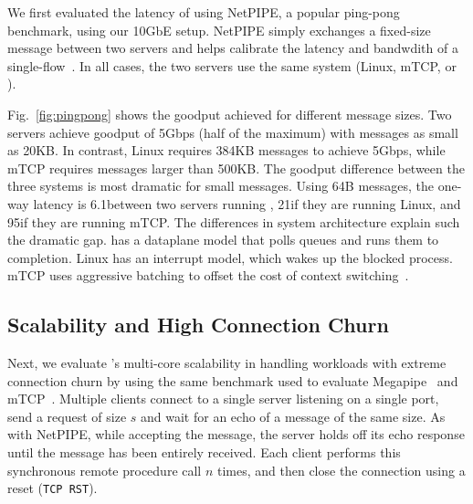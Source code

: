 We first evaluated the latency of \ix using NetPIPE, a popular
ping-pong benchmark, using our 10GbE setup.  NetPIPE simply exchanges
a fixed-size message between two servers and helps calibrate the
latency and bandwdith of a single-flow~\cite{snell1996netpipe}.  In
all cases, the two servers use the same system (Linux, mTCP, or \ix).


Fig.~\ref{fig:pingpong} shows the goodput achieved for
different message sizes.  Two \ix servers achieve goodput of 5Gbps
(half of the maximum) with messages as small as 20KB. In
contrast, Linux requires 384KB messages to achieve 5Gbps, while
mTCP requires messages larger than 500KB. The goodput difference
between the three systems is most dramatic for small messages. Using
64B messages, the one-way latency is 6.1\microsecond between two
servers running \ix, 21\microsecond if they are running Linux, and
95\microsecond if they are running mTCP.  The differences in system
architecture explain such the dramatic gap. \ix has a dataplane model
that polls queues and runs them to completion. Linux has an interrupt
model, which wakes up the blocked process. mTCP uses aggressive
batching to offset the cost of context switching~\cite{jeong2014mtcp}.


\subsection{Scalability and High Connection Churn}
\label{sec:eval:short}

%

Next, we evaluate \ix's multi-core scalability in handling workloads
with extreme connection churn by using the same benchmark used to
evaluate Megapipe~\cite{han2012megapipe} and
mTCP~\cite{jeong2014mtcp}. Multiple clients connect to a single server
listening on a single port, send a request of size $s$ and wait for an
echo of a message of the same size.  As with NetPIPE, while accepting
the message, the server holds off its echo response until the message
has been entirely received.  Each client performs this synchronous
remote procedure call $n$ times, and then close the connection using a
reset (\texttt{TCP RST}).


